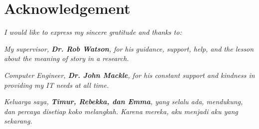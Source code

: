 \newpage
\centering
\section*{Acknowledgement} 

\vspace{6cm}
\textit{I would like to express my sincere gratitude and thanks to:}

\vspace{1cm}

\textit{My supervisor, \textbf{Dr. Rob Watson}, for his guidance, support, help, and the lesson about the meaning of story in a research.}

\textit{Computer Engineer, \textbf{Dr. John Mackle}, for his constant support and kindness in providing my IT needs at all time.}

\textit{Keluarga saya, \textbf{Timur, Rebekka, dan Emma}, yang selalu ada, mendukung, dan percaya disetiap koko melangkah. Karena mereka, aku menjadi aku yang sekarang.}





